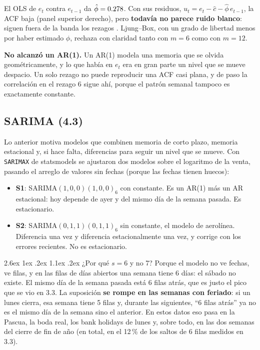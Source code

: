 \documentclass[11pt,letterpaper]{article}
\makeatletter
\renewcommand\paragraph{\@startsection{paragraph}{4}{\z@}%
  {2.6ex \@plus 1ex \@minus .2ex}%
  {1.1ex \@plus .2ex}%
  {\normalfont\normalsize\bfseries}}
\newcommand{\code}[1]{\texttt{#1}}
\newenvironment{respuesta}{\par\medskip}{\par\medskip}
\makeatother
\begin{document}
El OLS de $e_t$ contra $e_{t-1}$ da $\hat\phi=0.278$. Con sus
residuos, $u_t = e_t-\hat c-\hat\phi\,e_{t-1}$, la ACF baja (panel superior
derecho), pero \textbf{todavía no parece ruido blanco}: siguen fuera de la
banda los rezagos \FueraU. Ljung--Box, con un grado de libertad menos por
haber estimado $\phi$, rechaza con claridad tanto con $m=6$ como con $m=12$.

\begin{respuesta}
\textbf{No alcanzó un AR(1).} Un AR(1) modela una memoria que se olvida
geométricamente, y lo que había en $e_t$ era en gran parte un nivel que se
mueve despacio. Un solo rezago no puede reproducir una ACF casi plana, y de
paso la correlación en el rezago 6 sigue ahí, porque el patrón semanal
tampoco es exactamente constante.
\end{respuesta}

\subsection{SARIMA (4.3)}

Lo anterior motiva modelos que combinen memoria de corto plazo, memoria
estacional y, si hace falta, diferencias para seguir un nivel que se mueve.
Con \code{SARIMAX} de statsmodels se ajustaron dos modelos sobre el logaritmo
de la venta, pasando el arreglo de valores sin fechas (porque las fechas
tienen huecos):
\begin{itemize}[leftmargin=1.2em]
\item \textbf{S1}: SARIMA$(1,0,0)(1,0,0)_6$ con constante. Es un AR(1) más
un AR estacional: hoy depende de ayer y del mismo día de la semana pasada.
Es estacionario.
\item \textbf{S2}: SARIMA$(0,1,1)(0,1,1)_6$ sin constante, el modelo de
aerolínea. Diferencia una vez y diferencia estacionalmente una vez, y corrige
con los errores recientes. No es estacionario.
\end{itemize}

\paragraph{¿Por qué $s=6$ y no 7?} Porque el modelo no ve fechas, ve filas, y
en las filas de días abiertos una semana tiene 6 días: el sábado no existe.
El mismo día de la semana pasada está 6 filas atrás, que es justo el pico
que se vio en 3.3. La suposición \textbf{se rompe en las semanas con
feriado}: si un lunes cierra, esa semana tiene 5 filas y, durante las
siguientes, ``6 filas atrás'' ya no es el mismo día de la semana sino el
anterior. En estos datos eso pasa en la Pascua, la boda real, los bank
holidays de lunes y, sobre todo, en las dos semanas del cierre de fin de año
(en total, en el 12\,\% de los saltos de 6 filas medidos en 3.3).
\end{document}
